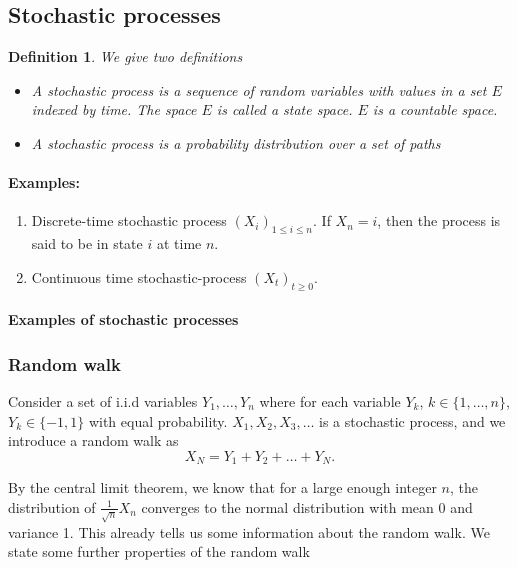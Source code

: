 \documentclass[12pt,a4paper]{article}
\newtheorem{definition}{Definition}
\begin{document}
\newpage
\subsection{Stochastic processes}
\begin{definition}
	We give two definitions
	\begin{itemize}
		\item 
		A stochastic process is a sequence of random variables with values in a set $E$ indexed by time.
		The space $E$ is called a state space. $E$ is a countable space. 
		\item A stochastic process is a probability distribution over a set of paths
	\end{itemize}
	\end{definition}
\paragraph{Examples:}
\begin{enumerate}
	\item Discrete-time stochastic process $(X_i)_{1\leq i\leq n}$. If $X_n = i$, then the process is said to be in state $i$ at time $n$.
	\item Continuous time stochastic-process $(X_t)_{t\geq 0}$.
\end{enumerate}



	
\paragraph{Examples of stochastic processes}

\subsubsection{Random walk}
Consider a set of i.i.d variables $Y_1,\ldots, Y_n$ where for each variable $Y_k$, $k\in\{1,\ldots, n\}$, $Y_k\in\{-1,1\}$ with equal probability. $X_1,X_2,X_3,\ldots$ is a stochastic process, and we introduce a random walk as 
\begin{equation}
	X_N = Y_1+Y_2+\ldots+ Y_N. 
\end{equation}

By the central limit theorem, we know that for a large enough integer $n$, the
distribution of $\frac{1}{\sqrt{n}} X_n$ converges to the normal distribution with mean 0 and
variance 1. This already tells us some information about the random walk.
We state some further properties of the random walk
\end{document}
